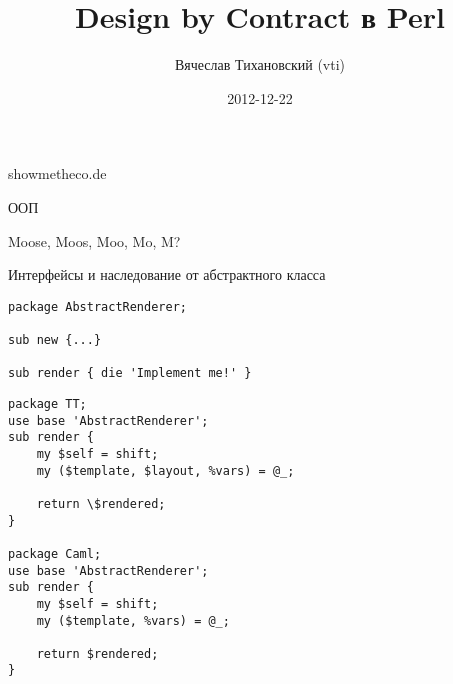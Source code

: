 \documentclass[14pt]{beamer}
\begin{document}
\title{Design by Contract в Perl}
\author{Вячеслав Тихановский (vti)}
\date{2012-12-22}

\lstset{commentstyle=\textit}
\lstset{basicstyle=\small,language=Perl}

\frame{\titlepage}

\begin{frame}
    \begin{center}
        showmetheco.de
    \end{center}
\end{frame}

\begin{frame}
    \begin{center}
        ООП
    \end{center}
\end{frame}

\begin{frame}
    \begin{center}
        Moose, Moos, Moo, Mo, M?
    \end{center}
\end{frame}

\begin{frame}
    \begin{center}
        Интерфейсы и наследование от абстрактного класса
    \end{center}
\end{frame}

\begin{frame}[fragile]
    \begin{lstlisting}
package AbstractRenderer;

sub new {...}

sub render { die 'Implement me!' }
    \end{lstlisting}
\end{frame}

\begin{frame}[fragile]
    \begin{lstlisting}
package TT;
use base 'AbstractRenderer';
sub render {
    my $self = shift;
    my ($template, $layout, %vars) = @_;

    return \$rendered;
}

package Caml;
use base 'AbstractRenderer';
sub render {
    my $self = shift;
    my ($template, %vars) = @_;

    return $rendered;
}
    \end{lstlisting}
\end{frame}
\end{document}
